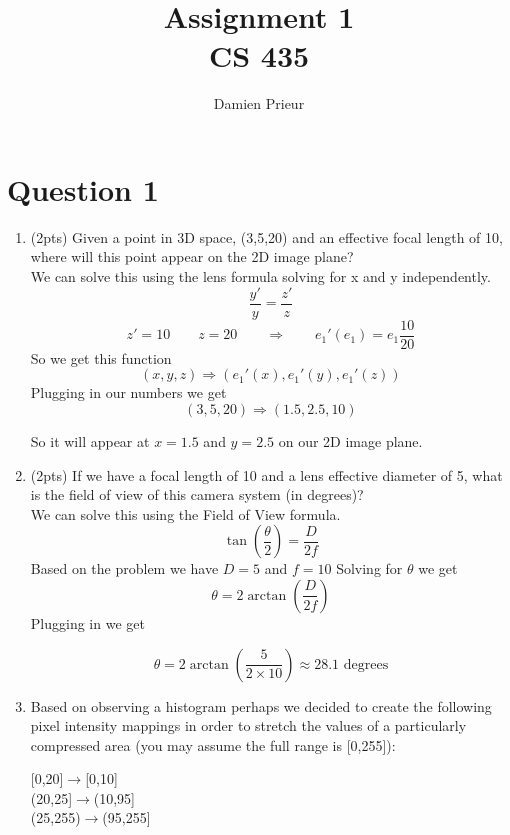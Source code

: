 \documentclass{article}
\author{Damien Prieur}
\title{Assignment 1 \\ CS 435}
\date{}
\begin{document}
\maketitle

\section*{Question 1}
\begin{enumerate}
\item (2pts) Given a point in 3D space, (3,5,20) and an effective focal length of 10, where will this point appear on the 2D image plane?
\\
We can solve this using the lens formula solving for x and y independently.
$$ \frac{y'}{y} = \frac{z'}{z} $$
$$ z' = 10 \qquad z = 20 \qquad \Rightarrow \qquad e_1'(e_1) = e_1 \frac{10}{20} $$
So we get this function
$$ (x,y,z) \Rightarrow (e_1'(x), e_1'(y), e_1'(z)) $$
Plugging in our numbers we get
$$ (3,5,20) \Rightarrow (1.5,2.5,10) $$

So it will appear at $ x = 1.5 $ and $ y = 2.5 $ on our 2D image plane.


\item (2pts) If we have a focal length of 10 and a lens effective diameter of 5, what is the field of view of this camera system (in degrees)?
\\
We can solve this using the Field of View formula.
$$ \tan\left(\frac{\theta}{2}\right)=\frac{D}{2f} $$
Based on the problem we have $D = 5 $ and $ f = 10 $
Solving for $\theta$ we get
$$ \theta = 2\arctan\left(\frac{D}{2f}\right) $$
Plugging in we get

$$ \theta = 2\arctan\left(\frac{5}{2\times 10}\right) \approx 28.1\text{ degrees}$$

\item   Based on observing a histogram perhaps we decided to create the following pixel intensity mappings in order to stretch the values of a particularly compressed area (you may assume the full range is [0,255]):\\

\begin{center}
[0,20]$\rightarrow$[0,10]\\
(20,25]$\rightarrow$(10,95]\\
(25,255)$\rightarrow$(95,255]
\end{center}


\end{enumerate}
\end{document}
